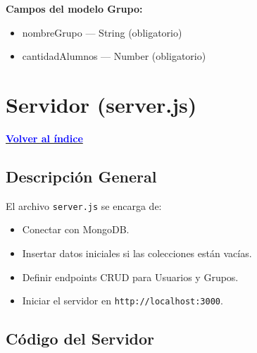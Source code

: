 \documentclass[12pt,a4paper]{article}
\newcommand{\volverindice}{\noindent\hyperlink{toc}{\textcolor{blue}{\textbf{Volver al índice}}}\par\vspace{0.5cm}}
\begin{document}
\textbf{Campos del modelo Grupo:}

\begin{itemize}
    \item nombreGrupo — String (obligatorio)
    \item cantidadAlumnos — Number (obligatorio)
\end{itemize}

\section{Servidor (server.js)}
\volverindice

\subsection{Descripción General}

El archivo \texttt{server.js} se encarga de:

\begin{itemize}
    \item Conectar con MongoDB.
    \item Insertar datos iniciales si las colecciones están vacías.
    \item Definir endpoints CRUD para Usuarios y Grupos.
    \item Iniciar el servidor en \texttt{http://localhost:3000}.
\end{itemize}

\subsection{Código del Servidor}
\end{document}
